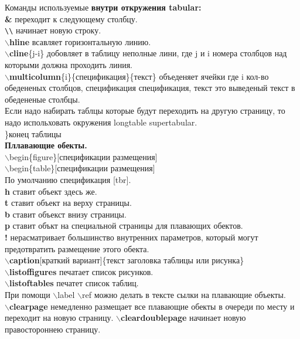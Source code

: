 \documentclass{article}
\newcommand{\bb}[1]{{\bfseries $\backslash$#1}} %
\begin{document}
Команды используемые {\bfseries внутри откружения tabular:}\\
{\bfseries \&} переходит к следующему столбцу.\\
\verb|\\| начинает новую строку.\\
\bb{hline} всавляет горизонтальную линию.\\
\bb{cline}\{j-i\} добовляет в таблицу неполные лини, где j и i номера столбцов над которыми должна проходить линия.\\ 
\bb{multicolumn}\{i\}\{спецификация\}\{текст\} объеденяет ячейки где i кол-во обедененых столбцов, спецификация спецификация, текст это выведеный текст в обедененые столбцы.\\

Если надо набирать таблцы которые будут переходить на другую страницу, то надо испольховать окружения longtable supertabular.\\
\}конец таблицы\\

{\bfseries Пллавающие обекты.}\\
$\backslash$begin\{figure\}[спецификации размещения]\\
$\backslash$begin\{table\}[спецификации размещения]\\
По умолчанию спецификация [tbr].\\
{\bfseries h} ставит объект здесь же.\\
{\bfseries t} ставит объект на верху страницы.\\
{\bfseries b} ставит объекст внизу страницы.\\
{\bfseries p} ставит объкт на специальной страницы для плавающих обектов.\\
{\bfseries !} нерасматривает большинство внутренних параметров, который могут предотвратить размещение этого обекта.\\
\bb{caption}[краткий вариант]\{текст заголовка таблицы или рисунка\}\\
\bb{listoffigures} печатает список рисунков.\\
\bb{listoftables} печатет список таблиц.\\
При помощи $\backslash$label $\backslash$ref можно делать в тексте сылки на плавающие объекты.\\
\bb{clearpage} немедленно размещает все плавающие обекты в очереди по месту и переходит на новую страницу. \bb{cleardoublepage} начинает новую правостороннею страницу.\\
\end{document}

